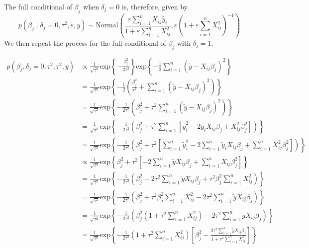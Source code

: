 \documentclass[
]{article}
\begin{document}
The full conditional of \(\beta_j\) when \(\delta_j=0\) is, therefore,
given by
\[p(\beta_j \mid \delta_j=0, \tau^2, \varepsilon,y) \sim \text{Normal}\left(\frac{\varepsilon\sum_{i=1}^n X_{ij}\tilde{y_i}}{1+\varepsilon\sum_{i=1}^nX_{ij}^2}, \varepsilon\left(1 + \varepsilon\sum_{i=1}^nX_{ij}^2 \right)^{-1} \right)\]
We then repeat the process for the full conditional of \(\beta_j\) with
\(\delta_j=1\).

\begin{align*}
p(\beta_j, \delta_j=0, \tau^2, \tau^2, y) &\propto \frac{1}{\sqrt{\tau^2}}\text{exp}\left\{-\frac{\beta_j^2}{2\tau^2} \right\} \text{exp}\left\{-\frac{1}{2}\sum_{i=1}^n \left(\tilde{y} - X_{ij}\beta_j \right)^2 \right\} \\
    &=    \frac{1}{\sqrt{\tau^2}}\text{exp}\left\{-\frac{1}{2} \left(\frac{\beta_j^2}{\tau^2} + \sum_{i=1}^n \left(\tilde{y} - X_{ij}\beta_j  \right)^2 \right) \right\} \\
    &=    \frac{1}{\sqrt{\tau^2}}\text{exp}\left\{-\frac{1}{2\tau^2} \left(\beta_j^2 + \tau^2 \sum_{i=1}^n\left(\tilde{y} - X_{ij}\beta_j \right)^2 \right) \right\} \\
    &=    \frac{1}{\sqrt{\tau^2}}\text{exp}\left\{-\frac{1}{2\tau^2} \left(\beta_j^2 + \tau^2 \sum_{i=1}^n \left[\tilde{y}_i^2 - 2\tilde{y}_i X_{ij}\beta_j + X_{ij}^2\beta_j^2 \right] \right) \right\} \\
    &=    \frac{1}{\sqrt{\tau^2}}\text{exp}\left\{-\frac{1}{2\tau^2} \left(\beta_j^2 + \tau^2 \left[\sum_{i=1}^n \tilde{y}_i^2 - 2\sum_{i=1}^n\tilde{y}_i X_{ij}\beta_j + \sum_{i=1}^n X_{ij}^2\beta_j^2 \right] \right) \right\} \\
    &\propto    \frac{1}{\sqrt{\tau^2}}\text{exp}\left\{\beta_j^2 + \tau^2 \left[-2\sum_{i=1}^n\tilde{y}X_{ij}\beta_j+\sum_{i=1}^n X_{ij} \beta_j^2\right] \right\} \\
    &=    \frac{1}{\sqrt{\tau^2}}\text{exp}\left\{-\frac{1}{2\tau^2}\left(\beta_j^2 - 2\tau^2\sum_{i=1}^n\tilde{y}X_{ij}\beta_j + \tau^2\beta_j^2 \sum_{i=1}^nX_{ij}^2 \right) \right\} \\
    &=    \frac{1}{\sqrt{\tau^2}}\text{exp}\left\{-\frac{1}{2\tau^2}\left(\beta_j^2 + \tau^2\beta_j^2 \sum_{i=1}^nX_{ij}^2- 2\tau^2\sum_{i=1}^n\tilde{y}X_{ij}\beta_j  \right) \right\} \\
    &=    \frac{1}{\sqrt{\tau^2}}\text{exp}\left\{-\frac{1}{2\tau^2}\left(\beta_j^2 \left(1 + \tau^2\sum_{i=1}^nX_{ij}^2 \right) - 2\tau^2\sum_{i=1}^n\tilde{y}X_{ij}\beta_j  \right) \right\} \\
    &=    \frac{1}{\sqrt{\tau^2}}\text{exp}\left\{-\frac{1}{2\tau^2} \left(1 + \tau^2 \sum_{i=1}^nX_{ij}^2 \right)\left[\beta_j^2- \frac{2\tau^2\sum_{i=1}^n \tilde{y}X_{ij}\beta_j}{1 + \tau^2\sum_{i=1}^nX_{ij}^2} \right] \right\} \\

\end{align*}
\end{document}
